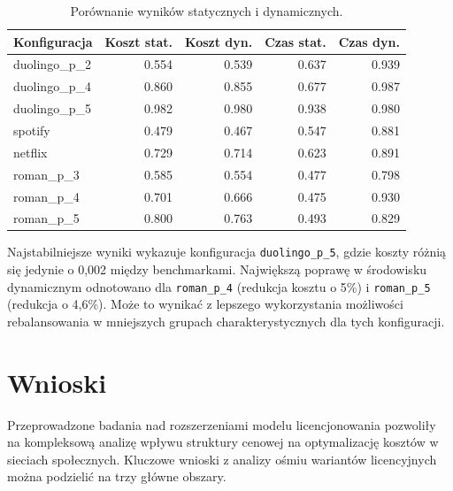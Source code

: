 \begin{table}[H]
  \centering
  \caption{Porównanie wyników statycznych i dynamicznych.}
  \label{tab:ext-static-dynamic-comparison}
  \begin{tabular}{lrrrr}
    \toprule
    \textbf{Konfiguracja} & \textbf{Koszt stat.} & \textbf{Koszt dyn.} & \textbf{Czas stat.} & \textbf{Czas dyn.} \\
    \midrule
    duolingo\_p\_2        & 0.554                & 0.539               & 0.637               & 0.939              \\
    duolingo\_p\_4        & 0.860                & 0.855               & 0.677               & 0.987              \\
    duolingo\_p\_5        & 0.982                & 0.980               & 0.938               & 0.980              \\
    spotify               & 0.479                & 0.467               & 0.547               & 0.881              \\
    netflix               & 0.729                & 0.714               & 0.623               & 0.891              \\
    roman\_p\_3           & 0.585                & 0.554               & 0.477               & 0.798              \\
    roman\_p\_4           & 0.701                & 0.666               & 0.475               & 0.930              \\
    roman\_p\_5           & 0.800                & 0.763               & 0.493               & 0.829              \\
    \bottomrule
  \end{tabular}
\end{table}

Najstabilniejsze wyniki wykazuje konfiguracja \texttt{duolingo\_p\_5}, gdzie koszty różnią się jedynie o 0,002 między benchmarkami. Największą poprawę w środowisku dynamicznym odnotowano dla \texttt{roman\_p\_4} (redukcja kosztu o 5\%) i \texttt{roman\_p\_5} (redukcja o 4,6\%). Może to wynikać z lepszego wykorzystania możliwości rebalansowania w mniejszych grupach charakterystycznych dla tych konfiguracji.
\section{Wnioski}

Przeprowadzone badania nad rozszerzeniami modelu licencjonowania pozwoliły na kompleksową analizę wpływu struktury cenowej na optymalizację kosztów w sieciach społecznych. Kluczowe wnioski z analizy ośmiu wariantów licencyjnych można podzielić na trzy główne obszary.

